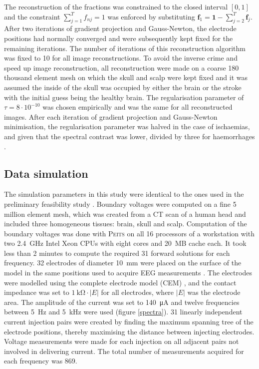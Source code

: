 The reconstruction of the fractions was constrained to the closed interval $[0, 1]$ and the constraint $\sum_{j=1}^T f_{nj} = 1$ was enforced by substituting $\boldsymbol{f}_1 = \boldsymbol{1} - \sum_{j=2}^T \boldsymbol{f}_j$. After two iterations of gradient projection and Gauss-Newton, the electrode positions had normally converged and were subsequently kept fixed for the remaining iterations. The number of iterations of this reconstruction algorithm was fixed to 10 for all image reconstructions. To avoid the inverse crime \citep{Lionheart2004} and speed up image reconstruction, all reconstruction were made on a coarse 180 thousand element mesh on which the skull and scalp were kept fixed and it was assumed the inside of the skull was occupied by either the brain or the stroke with the initial guess being the healthy brain. The regularisation parameter of $\tau=8\cdot10^{-10}$ was chosen empirically and was the same for all reconstructed images. After each iteration of gradient projection and Gauss-Newton minimisation, the regularisation parameter was halved in the case of ischaemias, and given that the spectral contrast was lower, divided by three for haemorrhages \citep{Viklands2001, Malone2014}.

\subsection{Data simulation}

The simulation parameters in this study were identical to the ones used in the preliminary feasibility study \citep{Malone2014}. Boundary voltages were computed on a fine 5 million element mesh, which was created from a CT scan of a human head and included three homogeneous tissues: brain, skull and scalp. Computation of the boundary voltages was done with \textsc{Peits} \citep{Jehl2015a} on all 16 processors of a workstation with two \SI{2.4}{\giga\hertz} Intel Xeon CPUs with eight cores and \SI{20}{MB} cache each. It took less than 2 minutes to compute the required 31 forward solutions for each frequency.
32 electrodes of diameter \SI{10}{\milli\metre} were placed on the surface of the model in the same positions used to acquire EEG measurements \citep{Tidswell2001}. The electrodes were modelled using the complete electrode model (CEM) \citep{Somersalo1992}, and the contact impedance was set to $\SI{1}{\kilo\ohm}\cdot \lvert E\rvert$ for all electrodes, where $\lvert E\rvert$ was the electrode area. The amplitude of the current was set to \SI{140}{\micro\ampere} and twelve frequencies between \SI{5}{\hertz} and \SI{5}{\kilo\hertz} were used (figure \ref{spectra}). 31 linearly independent current injection pairs were created by finding the maximum spanning tree of the electrode positions, thereby maximising the distance between injecting electrodes. Voltage measurements were made for each injection on all adjacent pairs not involved in delivering current. The total number of measurements acquired for each frequency was 869.


